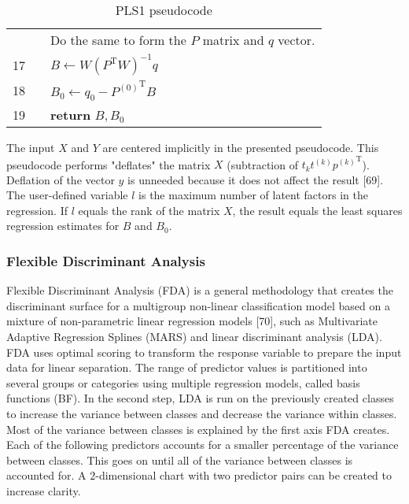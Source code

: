 \documentclass[preprint,12pt]{elsarticle}
\begin{document}
\begin{table}[ht]
{\begin{tabular}{|r l l l l|}
            \rowcolor{backcolour} & & \multicolumn{3}{l|}{Do the same to form the $P$ matrix and $q$ vector.} \\
            \rowcolor{backcolour} 17 & & \multicolumn{3}{l|}{$B\gets W{(P^{\mathrm{T}}W)}^{-1}q$} \\
            \rowcolor{backcolour} 18 & & \multicolumn{3}{l|}{$B_{0}\gets q_{0}-{P^{(0)}}^{\mathrm{T}}B$} \\
            \rowcolor{backcolour} 19 & & \multicolumn{3}{l|}{\textbf{return} $B, B_{0}$} \\
            \hline
        \end{tabular}
    }
    \caption{PLS1 pseudocode}
    \label{tab:PLS1}
\end{table}

The input $X$ and $Y$ are centered implicitly in the presented pseudocode. This pseudocode performs "deflates" the matrix $X$ (subtraction of $t_{k}t^{(k)}{p^{(k)}}^{\mathrm{T}}$). Deflation of the vector $y$ is unneeded because it does not affect the result [69]. The user-defined variable $l$ is the maximum number of latent factors in the regression. If $l$ equals the rank of the matrix $X$, the result equals the least squares regression estimates for $B$ and $B_{0}$.

\subsubsection{Flexible Discriminant Analysis}

Flexible Discriminant Analysis (FDA) is a general methodology that creates the discriminant surface for a multigroup non-linear classification model based on a mixture of non-parametric linear regression models [70], such as Multivariate Adaptive Regression Splines (MARS) and linear discriminant analysis (LDA). FDA uses optimal scoring to transform the response variable to prepare the input data for linear separation. The range of predictor values is partitioned into several groups or categories using multiple regression models, called basis functions (BF). In the second step, LDA is run on the previously created classes to increase the variance between classes and decrease the variance within classes. 
Most of the variance between classes is explained by the first axis FDA creates. Each of the following predictors accounts for a smaller percentage of the variance between classes. This goes on until all of the variance between classes is accounted for. A $2$-dimensional chart with two predictor pairs can be created to increase clarity.
\end{document}
